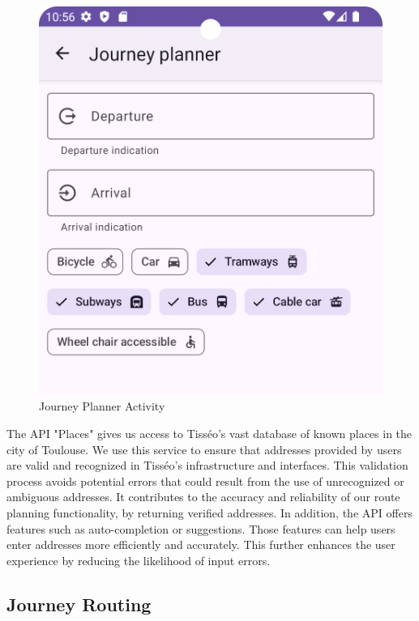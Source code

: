 \begin{figure}[H]
    \centering
    \includegraphics[scale=0.20]{img/journey.png}
    \caption{Journey Planner Activity}
    \label{fig:JourneyPlanner}
\end{figure}


The API "Places" gives us access to Tisséo's vast database of known places in the city of Toulouse. We use this service to ensure that addresses provided by users are valid and recognized in Tisséo's infrastructure and interfaces. This validation process avoids potential errors that could result from the use of unrecognized or ambiguous addresses. It contributes to the accuracy and reliability of our route planning functionality, by returning verified addresses. In addition, the API offers features such as auto-completion or suggestions. Those features can help users enter addresses more efficiently and accurately. This further enhances the user experience by reducing the likelihood of input errors.


\subsection{Journey Routing}


